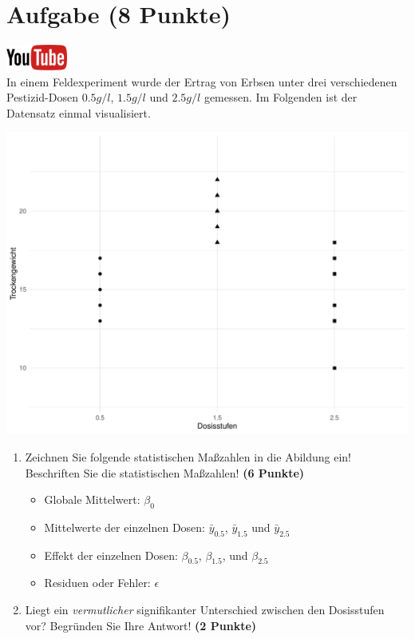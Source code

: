 \documentclass[a4paper, 9pt]{scrartcl}\usepackage[]{graphicx}\usepackage[]{xcolor}
\makeatletter
\def\maxwidth{ %
  \ifdim\Gin@nat@width>\linewidth
    \linewidth
  \else
    \Gin@nat@width
  \fi
}
\newenvironment{knitrout}{}{} %
\makeatother
\begin{document}
\section{Aufgabe \hfill (8 Punkte)}

\hfill\href{https://youtu.be/Q7xtQJoOmQI}{\includegraphics[width =
  2cm]{img/youtube}}\\[1Ex]



In einem Feldexperiment wurde der Ertrag von Erbsen unter drei verschiedenen
Pestizid-Dosen $0.5 g/l$, $1.5 g/l$ und $2.5 g/l$ gemessen. Im Folgenden ist der
Datensatz einmal visualisiert.

\begin{knitrout}
\color{fgcolor}

{\centering \includegraphics[width=\maxwidth]{img/anova-01-a-1} 

}


\end{knitrout}

\begin{enumerate}
\item Zeichnen Sie folgende statistischen Ma{\ss}zahlen in die Abildung ein!
  Beschriften Sie die statistischen Ma{\ss}zahlen! \textbf{(6 Punkte)}
  \begin{itemize}
  \item Globale Mittelwert: $\beta_0$
  \item Mittelwerte der einzelnen Dosen: $\bar{y}_{0.5}$, $\bar{y}_{1.5}$ und $\bar{y}_{2.5}$
  \item Effekt der einzelnen Dosen: $\beta_{0.5}$, $\beta_{1.5}$,
    und $\beta_{2.5}$
  \item Residuen oder Fehler: $\epsilon$
  \end{itemize}
\item Liegt ein \textit{vermutlicher} signifikanter Unterschied zwischen
  den Dosisstufen vor? Begr{\"u}nden Sie Ihre Antwort! \textbf{(2 Punkte)}
\end{enumerate}
 
\end{document}
